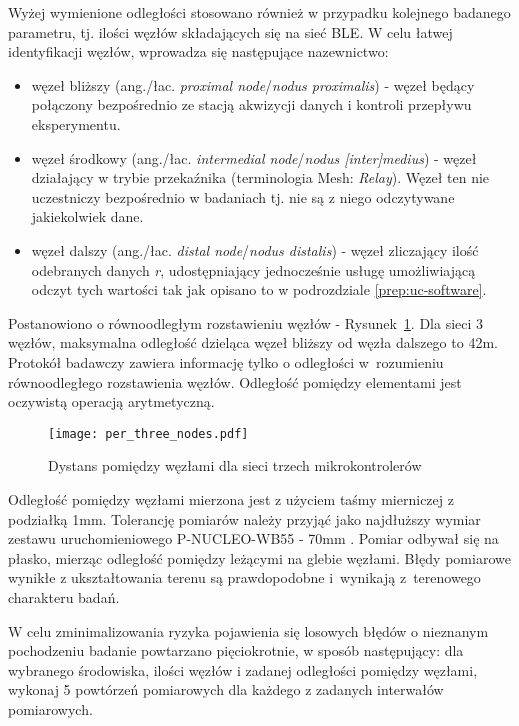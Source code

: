 Wyżej wymienione odległości stosowano również w przypadku kolejnego badanego parametru, tj. ilości węzłów
składających się na sieć BLE. W celu łatwej identyfikacji węzłów, wprowadza się następujące nazewnictwo:
\begin{itemize}
	\item węzeł bliższy (ang./łac. \textit{proximal node}/\textit{nodus proximalis}) - węzeł będący połączony bezpośrednio
	ze stacją akwizycji danych i kontroli przepływu eksperymentu.
	\item węzeł środkowy (ang./łac. \textit{intermedial node}/\textit{nodus [inter]medius}) - węzeł działający w trybie
	przekaźnika (terminologia Mesh: \textit{Relay}). Węzeł ten nie uczestniczy bezpośrednio w badaniach tj. nie są
	z niego odczytywane jakiekolwiek dane.
	\item węzeł dalszy (ang./łac. \textit{distal node}/\textit{nodus distalis}) - węzeł zliczający ilość odebranych danych \textit{r},
	udostępniający jednocześnie usługę umożliwiającą odczyt tych wartości tak jak opisano to w podrozdziale \ref{prep:uc-software}.
\end{itemize}

Postanowiono o równoodległym rozstawieniu węzłów - Rysunek~\ref{rys:three_nodes_setup}. Dla sieci 3 węzłów,
maksymalna odległość dzieląca węzeł bliższy od węzła dalszego to 42m. Protokół badawczy zawiera informację 
tylko o odległości w~rozumieniu równoodległego rozstawienia węzłów. Odległość pomiędzy elementami 
jest oczywistą operacją arytmetyczną.

\begin{figure}[!ht]
	\centering \texttt{[image: per\_three\_nodes.pdf]} 
	\caption{Dystans pomiędzy węzłami dla sieci trzech mikrokontrolerów}
	\label{rys:three_nodes_setup}
\end{figure}

Odległość pomiędzy węzłami mierzona jest z użyciem taśmy mierniczej z podziałką 1mm. Tolerancję pomiarów należy
przyjąć jako najdłuższy wymiar zestawu uruchomieniowego P-NUCLEO-WB55 - 70mm \cite{stmicroelectronics_um2435_2019}.
Pomiar odbywał się na płasko, mierząc odległość pomiędzy leżącymi na glebie węzłami. Błędy pomiarowe wynikłe
z ukształtowania terenu są prawdopodobne i~wynikają z~terenowego charakteru badań.

W celu zminimalizowania ryzyka pojawienia się losowych błędów o nieznanym pochodzeniu badanie powtarzano pięciokrotnie,
w sposób następujący: dla wybranego środowiska, ilości węzłów i zadanej odległości pomiędzy węzłami, wykonaj
5 powtórzeń pomiarowych dla każdego z zadanych interwałów pomiarowych.

